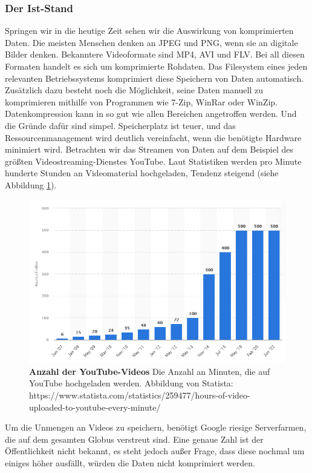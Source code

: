 \subsubsection*{Der Ist-Stand}
Springen wir in die heutige Zeit sehen wir die Auswirkung von komprimierten Daten.
Die meisten Menschen denken an JPEG und PNG, wenn sie an digitale Bilder denken.
Bekanntere Videoformate sind MP4, AVI und FLV.
Bei all diesen Formaten handelt es sich um komprimierte Rohdaten.
Das Filesystem eines jeden relevanten Betriebssystems komprimiert diese Speichern von Daten automatisch.
Zusätzlich dazu besteht noch die Möglichkeit, seine Daten manuell zu komprimieren mithilfe von Programmen wie 7-Zip, WinRar oder WinZip.
Datenkompression kann in so gut wie allen Bereichen angetroffen werden.
Und die Gründe dafür sind simpel.
Speicherplatz ist teuer, und das Ressourcenmanagement wird deutlich vereinfacht, wenn die benötigte Hardware minimiert wird.
Betrachten wir das Streamen von Daten auf dem Beispiel des größten Videostreaming-Dienstes YouTube.
Laut Statistiken werden pro Minute hunderte Stunden an Videomaterial hochgeladen, Tendenz steigend (siehe Abbildung \ref{fig:youtube}).
\begin{figure}[htb]
  \centering  
  \includegraphics[scale=0.8]{Bilder/youtube_statistik.png}
  \caption[YouTube Statistik]{\textbf{Anzahl der YouTube-Videos} Die Anzahl an Minuten, die auf YouTube hochgeladen werden.
  Abbildung von Statista: https://www.statista.com/statistics/259477/hours-of-video-uploaded-to-youtube-every-minute/ }
  \label{fig:youtube}
\end{figure}
Um die Unmengen an Videos zu speichern, benötigt Google riesige Serverfarmen, die auf dem gesamten Globus verstreut sind.
Eine genaue Zahl ist der Öffentlichkeit nicht bekannt, es steht jedoch außer Frage, dass diese nochmal um einiges höher ausfällt, würden die Daten nicht komprimiert werden. \newline

